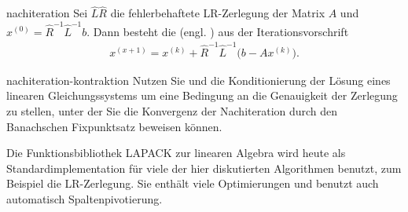 \begin{Definition}{nachiteration}
  Sei $\widehat L\widehat R$ die fehlerbehaftete LR-Zerlegung der Matrix $A$
  und $x^{(0)} = \widehat R^{-1}\widehat L^{-1} b$. Dann besteht die
   (engl. ) aus der
  Iterationsvorschrift
  \begin{gather}
    x^{(x+1)} = x^{(k)} + \widehat R^{-1}\widehat L^{-1}
    \bigl(b-Ax^{(k)}\bigr).
  \end{gather}
\end{Definition}

\begin{Aufgabe}{nachiteration-kontraktion}
  Nutzen Sie  und die Konditionierung der
  Lösung eines linearen Gleichungssystems um eine Bedingung an die
  Genauigkeit der Zerlegung zu stellen, unter der Sie die Konvergenz
  der Nachiteration durch den Banachschen Fixpunktsatz beweisen
  können.
\end{Aufgabe}

\begin{remark}
  Die Funktionsbibliothek LAPACK zur linearen Algebra wird heute als
  Standardimplementation für viele der hier diskutierten Algorithmen
  benutzt, zum Beispiel die LR-Zerlegung. Sie enthält viele
  Optimierungen und benutzt auch automatisch Spaltenpivotierung.
\end{remark}




